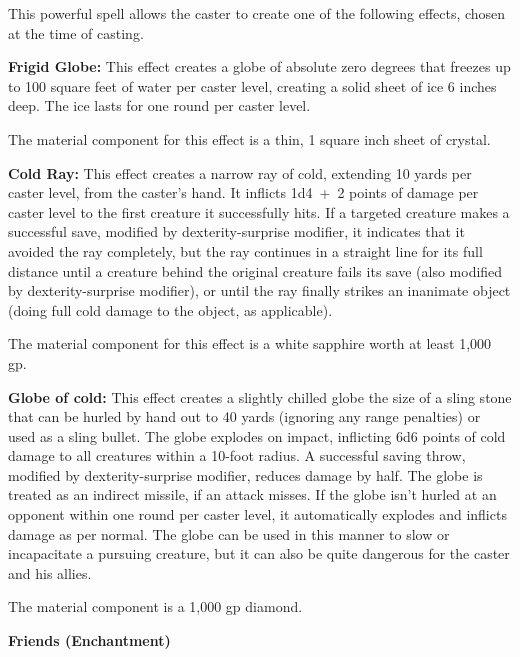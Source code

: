 \begin{multicols}{2}
\begin{minipage}{\columnwidth}
\end{minipage}

This powerful spell allows the caster to create one of the following effects, chosen at the time of casting.

\textbf{Frigid Globe:} This effect creates a globe of absolute zero degrees that freezes up to 100 square feet of water per caster level, creating a solid sheet of ice 6 inches deep.  The ice lasts for one round per caster level. 

The material component for this effect is a thin, 1 square inch sheet of crystal.

\textbf{Cold Ray:} This effect creates a narrow ray of cold, extending 10 yards per caster level, from the caster's hand.  It inflicts 1d4~+~2 points of damage per caster level to the first creature it successfully hits.  If a targeted creature makes a successful save, modified by dexterity-surprise modifier, it indicates that it avoided the ray completely, but the ray continues in a straight line for its full distance until a creature behind the original creature fails its save (also modified by dexterity-surprise modifier), or until the ray finally strikes an inanimate object (doing full cold damage to the object, as applicable).  

The material component for this effect is a white sapphire worth at least 1,000 gp.  

\textbf{Globe of cold:}  This effect creates a slightly chilled globe the size of a sling stone that can be hurled by hand out to 40 yards (ignoring any range penalties) or used as a sling bullet.  The globe explodes on impact, inflicting 6d6 points of cold damage to all creatures within a 10-foot radius.  A successful saving throw, modified by dexterity-surprise modifier, reduces damage by half.  The globe is treated as an indirect missile, if an attack misses.  If the globe isn't hurled at an opponent within one round per caster level, it automatically explodes and inflicts damage as per normal.  The globe can be used in this manner to slow or incapacitate a pursuing creature, but it can also be quite dangerous for the caster and his allies.

The material component is a 1,000 gp diamond.

\vspace{1em}

\noindent
\begin{minipage}{\columnwidth}

\noindent \textbf{Friends (Enchantment)}


\end{minipage}
\end{multicols}
